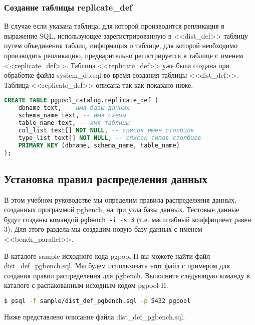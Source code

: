 \subsubsection{Создание таблицы replicate\_def}

В случае если указана таблица, для которой производится репликация в выражение SQL, использующее зарегистрированную в <<dist\_def>> таблицу путем объединения таблиц, информация о таблице, для которой необходимо производить репликацию, предварительно регистрируется в таблице с именем <<replicate\_def>>. Таблица <<replicate\_def>> уже была создана при обработке файла system\_db.sql во время создания таблицы <<dist\_def>>. Таблица <<replicate\_def>> описана так как показано ниже.

\begin{lstlisting}[language=SQL,label=lst:pgpool31:1,caption=Создание таблицы replicate\_def]
CREATE TABLE pgpool_catalog.replicate_def (
    dbname text, -- имя базы данных
    schema_name text, -- имя схемы
    table_name text, -- имя таблицы
    col_list text[] NOT NULL, -- список имен столбцов
    type_list text[] NOT NULL, -- список типов столбцов
    PRIMARY KEY (dbname, schema_name, table_name)
);
\end{lstlisting}


\subsection{Установка правил распределения данных}
\label{sec:pgpool-II-raspr-data}

В этом учебном руководстве мы определим правила распределения данных, созданных программой pgbench, на три узла базы данных. Тестовые данные будут созданы командой \lstinline!pgbench -i -s 3! (т.е. масштабный коэффициент равен 3). Для этого раздела мы создадим новую базу данных с именем <<bench\_parallel>>.

В каталоге sample исходного кода pgpool-II вы можете найти файл dist\_def\_pgbench.sql. Мы будем использовать этот файл с примером для создания правил распределения для pgbench. Выполните следующую команду в каталоге с распакованным исходным кодом pgpool-II.

\begin{lstlisting}[language=Bash,label=lst:pgpool32,caption=Установка правил распределения данных]
$ psql -f sample/dist_def_pgbench.sql -p 5432 pgpool
\end{lstlisting}

Ниже представлено описание файла dist\_def\_pgbench.sql.

